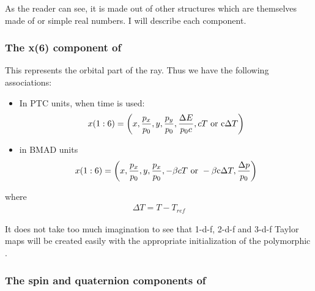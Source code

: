 \documentclass[english,12pt,article]{article} %
\begin{document}
As the reader can see, it is made out of other structures which are themselves made of  or simple real numbers.  I will describe each component.

 
  
  

  \subsubsection{The   x(6) component of   }\label{sec:codetypex6}

 This represents the orbital part of the ray. Thus we have the following associations:
 
 \begin{itemize}
\item In PTC units, when time is used: 
%
\begin{align} x(1:6)=
\left({x,{{p}_{x} \over {p}_{0}},y,{{p}_{y} \over {p}_{0}},{\Delta E \over {p}_{0}c},cT~{\rm o}{\rm r}~{\rm c}\Delta T}\right) \end{align}
\item in BMAD units
%
\begin{align} x(1:6)=
\left({x,{{p}_{x} \over {p}_{0}},y,{{p}_{x} \over {p}_{0}},-\beta cT~{\rm o}{\rm r}~-\beta {\rm c}\Delta T,{\Delta p \over {p}_{0}}}\right) \end{align}
\end{itemize}
where
%
\begin{align} \Delta T=
T-{T}_{ref} \end{align}

It does not take too much imagination to see that 1-d-f, 2-d-f and 3-d-f Taylor maps will be created easily with the appropriate initialization of the polymorphic . 

  \subsubsection{The   spin and quaternion components of   }\label{sec:code spin}
\end{document}
